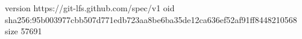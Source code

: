 version https://git-lfs.github.com/spec/v1
oid sha256:95b003977cbb507d771edb723aa8be6ba35de12ca636ef52af91ff8448210568
size 57691
